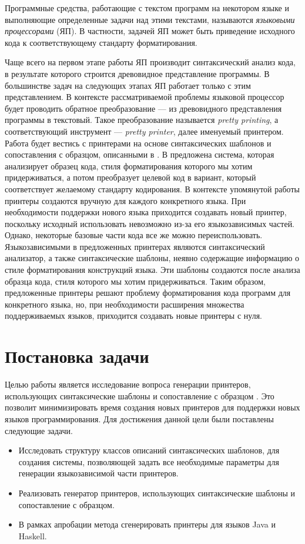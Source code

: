 \documentclass{matmex-diploma}
\begin{document}
Программные средства, работающие с текстом программ на некотором языке и выполняющие определенные задачи над этими текстами, называются \textit {языковыми процессорами} (ЯП). В частности, задачей ЯП может быть приведение исходного кода к соответствующему стандарту форматирования.

Чаще всего на первом этапе работы ЯП производит синтаксический анализ кода, в результате которого строится древовидное представление программы. В большинстве задач на следующих этапах ЯП работает только с этим представлением. В контексте рассматриваемой проблемы языковой процессор будет проводить обратное преобразование --- из древовидного представления программы в текстовый. Такое преобразование называется \textit{pretty printing}, а соответствующий инструмент --- \textit{pretty printer}, далее именуемый принтером. Работа будет вестись с принтерами на основе синтаксических шаблонов и сопоставления с образцом, описанными в \cite{podkopaev:course, podkopaev:diploma}. В \cite{podkopaev:diploma} предложена система, которая анализирует образец кода, стиля форматирования которого мы хотим придерживаться, а потом преобразует целевой код в вариант, который соответствует желаемому стандарту кодирования. В контексте упомянутой работы \cite{podkopaev:diploma} принтеры создаются вручную для каждого конкретного языка. При необходимости поддержки нового языка приходится создавать новый принтер, поскольку исходный использовать невозможно из-за его языкозависимых частей. Однако, некоторые базовые части кода все же можно переиспользовать. Языкозависимыми в предложенных принтерах являются синтаксический анализатор, а также синтаксические шаблоны, неявно содержащие информацию о стиле форматирования конструкций языка. Эти шаблоны создаются после анализа образца кода, стиля которого мы хотим придерживаться. Таким образом, предложенные принтеры решают проблему форматирования кода программ для конкретного языка, но, при необходимости расширения множества поддерживаемых языков, приходится создавать новые принтеры с нуля.

\section{Постановка задачи}

Целью работы является исследование вопроса генерации принтеров, использующих синтаксические шаблоны и сопоставление с образцом \cite{podkopaev:diploma}. 
Это позволит минимизировать время создания новых принтеров для поддержки новых языков программирования.
Для достижения данной цели были поставлены следующие задачи.
\begin{itemize}
\item Исследовать структуру классов описаний синтаксических шаблонов, для создания системы, позволяющей задать все необходимые параметры для генерации языкозависимой части принтеров.
\item Реализовать генератор принтеров, использующих синтаксические шаблоны и сопоставление с образцом.
\item В рамках апробации метода сгенерировать принтеры для языков Java и Haskell.
\end{itemize}
\end{document}
